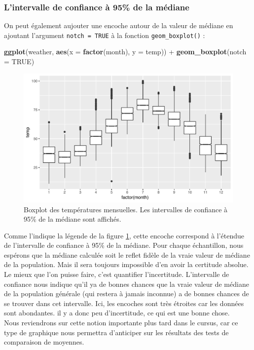 \documentclass[a4paperpaper,]{article}
\newenvironment{Shaded}{\begin{snugshade}}{\end{snugshade}}
\newcommand{\DataTypeTok}[1]{\textcolor[rgb]{0.00,0.34,0.68}{#1}}
\newcommand{\KeywordTok}[1]{\textcolor[rgb]{0.12,0.11,0.11}{\textbf{#1}}}
\newcommand{\NormalTok}[1]{\textcolor[rgb]{0.12,0.11,0.11}{#1}}
\newcommand{\OperatorTok}[1]{\textcolor[rgb]{0.12,0.11,0.11}{#1}}
\newcommand{\OtherTok}[1]{\textcolor[rgb]{0.00,0.43,0.16}{#1}}
\newcommand{\StringTok}[1]{\textcolor[rgb]{0.75,0.01,0.01}{#1}}
\theoremstyle{definition}
\theoremstyle{definition}
\theoremstyle{definition}
\theoremstyle{remark}
\begin{document}
\hypertarget{lintervalle-de-confiance-a-95-de-la-mediane}{%
\subsubsection{L'intervalle de confiance à 95\% de la
médiane}\label{lintervalle-de-confiance-a-95-de-la-mediane}}

On peut également aujouter une encoche autour de la valeur de médiane en
ajoutant l'argument \texttt{notch\ =\ TRUE} à la fonction
\texttt{geom\_boxplot()} :

\begin{Shaded}
\begin{Highlighting}[]
\KeywordTok{ggplot}\NormalTok{(weather, }\KeywordTok{aes}\NormalTok{(}\DataTypeTok{x =} \KeywordTok{factor}\NormalTok{(month), }\DataTypeTok{y =}\NormalTok{ temp)) }\OperatorTok{+}
\StringTok{  }\KeywordTok{geom_boxplot}\NormalTok{(}\DataTypeTok{notch =} \OtherTok{TRUE}\NormalTok{)}
\end{Highlighting}
\end{Shaded}

\begin{figure}[htpb]

{\centering \includegraphics[width=0.9\linewidth]{figure/notchedboxplot-1} 

}

\caption{Boxplot des températures mensuelles. Les intervalles de
confiance à 95\% de la médiane sont affichés.}\label{fig:notchedboxplot}
\end{figure}




Comme l'indique la légende de la figure \ref{fig:notchedboxplot}, cette
encoche correspond à l'étendue de l'intervalle de confiance à 95\% de la
médiane. Pour chaque échantillon, nous espérons que la médiane calculée
soit le reflet fidèle de la vraie valeur de médiane de la population.
Mais il sera toujours impossible d'en avoir la certitude absolue. Le
mieux que l'on puisse faire, c'est quantifier l'incertitude.
L'intervalle de confiance nous indique qu'il ya de bonnes chances que la
vraie valeur de médiane de la population générale (qui restera à jamais
inconnue) a de bonnes chances de se trouver dans cet intervalle. Ici,
les encoches sont très étroites car les données sont abondantes. il y a
donc peu d'incertitude, ce qui est une bonne chose.\\
Nous reviendrons sur cette notion importante plus tard dans le cursus,
car ce type de graphique nous permettra d'anticiper sur les résultats
des tests de comparaison de moyennes.
\end{document}
